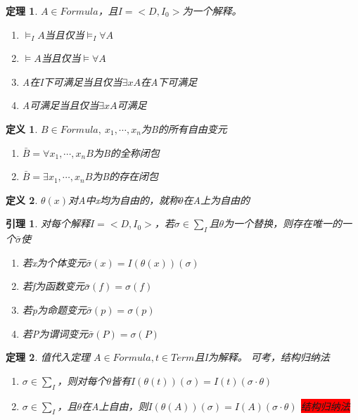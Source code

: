 \documentclass[a4paper]{ctexart}
\newtheorem{thm}{\hspace{2em}定理}[subsection]
\newtheorem{lem}{\hspace{2em}引理}
\newtheorem{defi}{\hspace{2em}定义}[subsection]
\newcommand{\shade}[1]{\colorbox{shadecolor}{#1}}
\newcommand{\redshade}[1]{\colorbox{red}{#1}}
\begin{document}
\begin{thm}
  $A\in Formula$，且$I=<D,I_0>$为一个解释。
  \begin{enumerate}[itemindent=2em]
    \item $\models_IA$当且仅当$\models_I\forall{A}$
    \item $\models A$当且仅当$\models\forall{A}$
    \item A在I下可满足当且仅当$\exists{x}A$在A下可满足
    \item A可满足当且仅当$\exists{x}A$可满足
  \end{enumerate}
\end{thm}

\begin{defi}
  $B\in Formula,\ x_1,\cdots,x_n$为B的所有自由变元
  \begin{enumerate}[itemindent=2em]
    \item $\bar{B}=\forall{x_1,\cdots,x_n}B$为B的全称闭包
    \item $\bar{B}=\exists{x_1,\cdots,x_n}B$为B的存在闭包
  \end{enumerate}
\end{defi}

\begin{defi}
  $\theta(x)$对A中x均为自由的，就称$\theta$在A上为自由的
\end{defi}

\begin{lem}
  对每个解释$I=<D,I_0>$，若$\sigma\in\sum_I$且$\theta$为一个替换，则存在唯一的一个$\bar{\sigma}$使
  \begin{enumerate}[itemindent=2em]
    \item 若x为个体变元$\bar{\sigma}(x)=I(\theta(x))(\sigma)$
    \item 若f为函数变元$\bar{\sigma}(f)=\sigma(f)$
    \item 若p为命题变元$\bar{\sigma}(p)=\sigma(p)$
    \item 若P为谓词变元$\bar{\sigma}(P)=\sigma(P)$
  \end{enumerate}
\end{lem}

\begin{thm}
  值代入定理 $A\in Formula,t\in Term$且I为解释。 \shade{可考，结构归纳法}
  \begin{enumerate}[itemindent=2em]
    \item $\sigma\in\sum_I$，则对每个$\theta$皆有$I(\theta(t))(\sigma)=I(t)(\sigma\cdot\theta)$
    \item $\sigma\in\sum_I$，且$\theta$在A上自由，则$I(\theta(A))(\sigma)=I(A)(\sigma\cdot\theta)$ \redshade{结构归纳法}
  \end{enumerate}
\end{thm}
\end{document}
